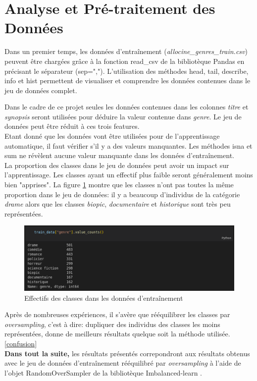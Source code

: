 \section{Analyse et Pré-traitement des Données}
Dans un premier temps, les données d'entraînement (\textit{allocine\_genres\_train.csv}) peuvent être chargées grâce à la fonction \textsf{read\_csv} de la bibliotèque Pandas \cite{pandas} en précisant le séparateur (\textsf{sep=","}). L'utilisation des méthodes \textsf{head}, \textsf{tail}, \textsf{describe}, \textsf{info} et \textsf{hist} permettent de visualiser et comprendre les données contenues dans le jeu de données complet.

Dans le cadre de ce projet seules les données contenues dans les colonnes \textit{titre} et \textit{synopsis} seront utilisées pour déduire la valeur contenue dans \textit{genre}. Le jeu de données peut être réduit à ces trois features.\\
Etant donné que les données vont être utilisées pour de l'apprentissage automatique, il faut vérifier s'il y a des valeurs manquantes. Les méthodes \textsf{isna} et \textsf{sum} ne révèlent aucune valeur manquante dans les données d'entraînement.\\
La proportion des classes dans le jeu de données peut avoir un impact sur l'apprentissage. Les classes ayant un effectif plus faible seront généralement moins bien "apprises". La figure \ref{value_counts} montre que les classes n'ont pas toutes la même proportion dans le jeu de données: il y a beaucoup d'individus de la catégorie \textit{drame} alors que les classes \textit{biopic}, \textit{documentaire} et \textit{historique} sont très peu représentées.

\begin{figure}
    \center
    \includegraphics[scale=.3]{img/value_counts.png}
    \caption{Effectifs des classes dans les données d'entraînement}
    \label{value_counts}
\end{figure}

Après de nombreuses expériences, il s'avère que rééquilibrer les classes par \textit{oversampling}, c'est à dire: dupliquer des individus des classes les moins représentées, donne de meilleurs résultats quelque soit la méthode utilisée. \ref{confusion}\\
\textbf{Dans tout la suite,} les résultats présentés correpondront aux résultats obtenus avec le jeu de données d'entraînement rééquilibré par \textit{oversampling} à l'aide de l'objet \textsf{RandomOverSampler} de la bibliotèque Imbalanced-learn \cite{imbalanced_learn}.

